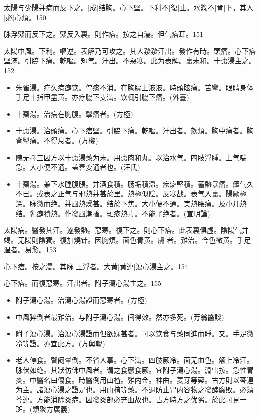 \documentclass[11pt,oneside,b5paper]{ctexbook}
\begin{document}
\begin{flushleft}
太陽与少陽并病而反下之。[成]结胸。心下堅。下利不[復]止。水漿不[肯]下。其人[必]心煩。150

脉浮緊而反下之。緊反入裏。則作痞。按之自濡。但气痞耳。151

太陽中風。下利。嘔逆。表解乃可攻之。其人漐漐汗出。發作有時。頭痛。心下痞堅滿。引脇下痛。乾嘔。短气。汗出。不惡寒。此为表解。裏未和。十棗湯主之。152

\begin{itemize}
\item 朱雀湯。疗久病癖饮。停痰不消。在胸膈上液液。時頭眩痛。苦攣。眼睛身体手足十指甲盡黄。亦疗脇下支滿。饮輒引脇下痛。(外臺)
\item 十棗湯。治病在胸腹。掣痛者。(方極)
\item 十棗湯。治頭痛。心下痞堅。引脇下痛。乾嘔。汗出者。欬煩。胸中痛者。胸背掣痛。不得息者。(方機)
\item 陳无擇三因方以十棗湯藥为末。用棗肉和丸。以治水气。四肢浮腫。上气喘急。大小便不通。盖善变通者也。(汪氏)
\item 十棗湯。兼下水腫腹脹。并酒食積。肠垢積滯。痃癖堅積。蓄熱暴痛。瘧气久不已。或表之正气与邪熱并甚於里。熱極似陰。反寒战。表气入裏。陽厥極深。脉微而绝。并風熱燥甚。结於下焦。大小便不通。実熱腰痛。及小儿熱结。乳癖積熱。作發風潮搐。斑疹熱毒。不能了绝者。(宣明論)
\end{itemize}

太陽病。醫發其汗。遂發熱。惡寒。復下之。則心下痞。此表裏俱虛。陰陽气并竭。无陽則陰獨。復加燒针。因胸煩。面色青黄。膚{𥆧}者。難治。今色微黄。手足温者。易愈。153

心下痞。按之濡。其脉{𬮦}上浮者。大黄[黄連]瀉心湯主之。154

心下痞。而復惡寒。汗出者。附子瀉心湯主之。155

\begin{itemize}
\item 附子瀉心湯。治瀉心湯證而惡寒者。(方極)
\item 中風猝倒者最難治。与附子瀉心湯。间得效。然亦多死。(芳翁醫談)
\item 附子瀉心湯。治瀉心湯證而但欲寐甚者。可以饮食与藥同進而睡。又。手足微冷等證。亦宜此方。(方輿輗)
\item 老人停食。瞀闷暈倒。不省人事。心下滿。四肢厥冷。面无血色。额上冷汗。脉伏如绝。其狀仿佛中風者。谓之食鬱食厥。宜附子瀉心湯。淵雷按。急性胃炎。中醫名曰傷食。時醫例用山楂。雞内金。神曲。麦芽等藥。古方則以芩連为主。諸瀉心湯之證是也。用山楂等藥。不過防止胃内容物之發酵腐敗。必須芩連。方能消除炎症。因發炎部必充血故也。古方時方之优劣。於此可見一斑。(類聚方廣義)
\end{itemize}


\end{flushleft}
\end{document}
